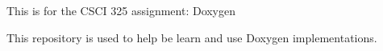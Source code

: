 This is for the CSCI 325 assignment\+: Doxygen

This repository is used to help be learn and use Doxygen implementations. 